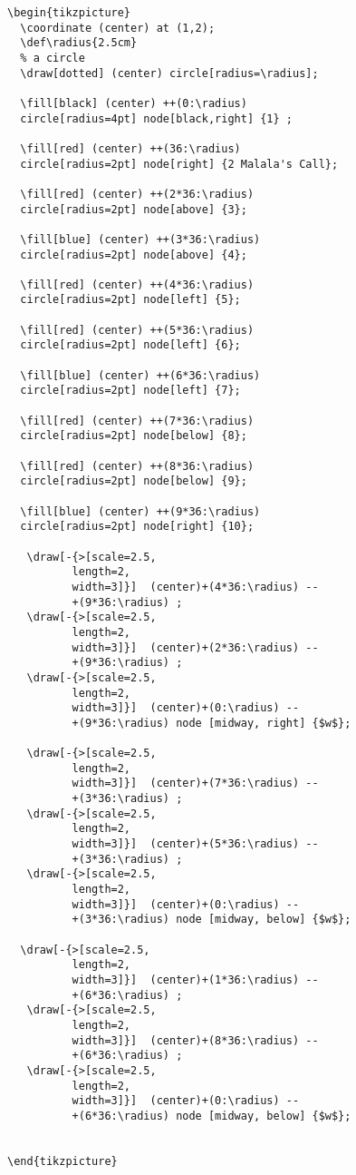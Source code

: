 \begin{verbatim}
\begin{tikzpicture}
  \coordinate (center) at (1,2);
  \def\radius{2.5cm}
  % a circle
  \draw[dotted] (center) circle[radius=\radius];

  \fill[black] (center) ++(0:\radius)
  circle[radius=4pt] node[black,right] {1} ;

  \fill[red] (center) ++(36:\radius)
  circle[radius=2pt] node[right] {2 Malala's Call};

  \fill[red] (center) ++(2*36:\radius)
  circle[radius=2pt] node[above] {3};

  \fill[blue] (center) ++(3*36:\radius)
  circle[radius=2pt] node[above] {4};

  \fill[red] (center) ++(4*36:\radius)
  circle[radius=2pt] node[left] {5};

  \fill[red] (center) ++(5*36:\radius)
  circle[radius=2pt] node[left] {6};

  \fill[blue] (center) ++(6*36:\radius)
  circle[radius=2pt] node[left] {7};

  \fill[red] (center) ++(7*36:\radius)
  circle[radius=2pt] node[below] {8};

  \fill[red] (center) ++(8*36:\radius)
  circle[radius=2pt] node[below] {9};

  \fill[blue] (center) ++(9*36:\radius)
  circle[radius=2pt] node[right] {10};

   \draw[-{>[scale=2.5,
          length=2,
          width=3]}]  (center)+(4*36:\radius) --
          +(9*36:\radius) ;
   \draw[-{>[scale=2.5,
          length=2,
          width=3]}]  (center)+(2*36:\radius) --
          +(9*36:\radius) ;
   \draw[-{>[scale=2.5,
          length=2,
          width=3]}]  (center)+(0:\radius) --
          +(9*36:\radius) node [midway, right] {$w$};

   \draw[-{>[scale=2.5,
          length=2,
          width=3]}]  (center)+(7*36:\radius) --
          +(3*36:\radius) ;
   \draw[-{>[scale=2.5,
          length=2,
          width=3]}]  (center)+(5*36:\radius) --
          +(3*36:\radius) ;
   \draw[-{>[scale=2.5,
          length=2,
          width=3]}]  (center)+(0:\radius) --
          +(3*36:\radius) node [midway, below] {$w$};

  \draw[-{>[scale=2.5,
          length=2,
          width=3]}]  (center)+(1*36:\radius) --
          +(6*36:\radius) ;
   \draw[-{>[scale=2.5,
          length=2,
          width=3]}]  (center)+(8*36:\radius) --
          +(6*36:\radius) ;
   \draw[-{>[scale=2.5,
          length=2,
          width=3]}]  (center)+(0:\radius) --
          +(6*36:\radius) node [midway, below] {$w$};


\end{tikzpicture}
\end{verbatim}


